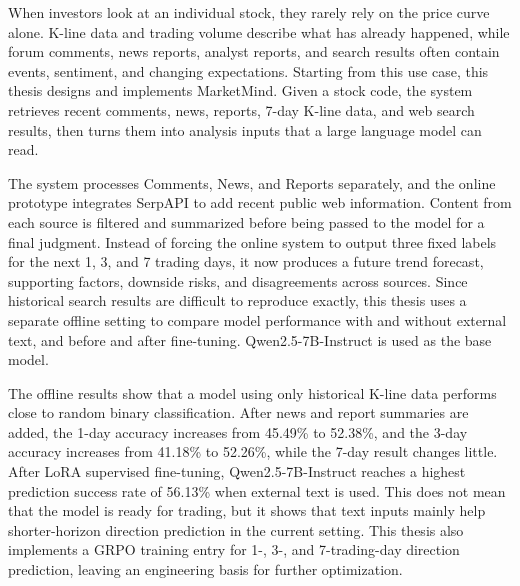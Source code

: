 \begin{abstract*}
When investors look at an individual stock, they rarely rely on the price curve alone. K-line data and trading volume describe what has already happened, while forum comments, news reports, analyst reports, and search results often contain events, sentiment, and changing expectations. Starting from this use case, this thesis designs and implements MarketMind. Given a stock code, the system retrieves recent comments, news, reports, 7-day K-line data, and web search results, then turns them into analysis inputs that a large language model can read.

The system processes Comments, News, and Reports separately, and the online prototype integrates SerpAPI to add recent public web information. Content from each source is filtered and summarized before being passed to the model for a final judgment. Instead of forcing the online system to output three fixed labels for the next 1, 3, and 7 trading days, it now produces a future trend forecast, supporting factors, downside risks, and disagreements across sources. Since historical search results are difficult to reproduce exactly, this thesis uses a separate offline setting to compare model performance with and without external text, and before and after fine-tuning. Qwen2.5-7B-Instruct is used as the base model.

The offline results show that a model using only historical K-line data performs close to random binary classification. After news and report summaries are added, the 1-day accuracy increases from 45.49\% to 52.38\%, and the 3-day accuracy increases from 41.18\% to 52.26\%, while the 7-day result changes little. After LoRA supervised fine-tuning, Qwen2.5-7B-Instruct reaches a highest prediction success rate of 56.13\% when external text is used. This does not mean that the model is ready for trading, but it shows that text inputs mainly help shorter-horizon direction prediction in the current setting. This thesis also implements a GRPO training entry for 1-, 3-, and 7-trading-day direction prediction, leaving an engineering basis for further optimization.
\end{abstract*}
